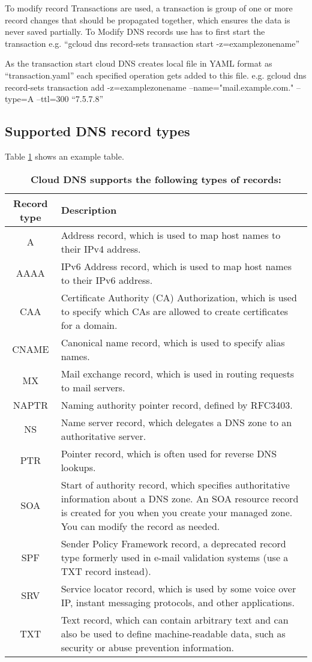 \documentclass[9pt,twocolumn,twoside]{styles/osajnl}
\begin{document}
To modify record Transactions are used, a transaction is group of one or more record changes that should be propagated together, which ensures the data is never saved partially. To Modify DNS records use has to first start the transaction
e.g. “gcloud dns record-sets transaction start -z=examplezonename” \cite{dns-overview}

As the transaction start cloud DNS creates local file in YAML format as “transaction.yaml” each specified operation gets added to this file.
e.g. gcloud dns record-sets transaction add -z=examplezonename --name="mail.example.com." --type=A --ttl=300 “7.5.7.8” \cite{dns-overview}

\subsection{Supported DNS record types}
Table \ref{tab:shape-functions} shows an example table.
\begin{table}[htbp]
\centering
\caption{\bf Cloud DNS supports the following types of records:}
\begin{tabular}{|c|p{7cm}|}
\hline Record type & Description \\
\hline\hline
A & Address record, which is used 
to map host names to their IPv4 address.\\
\hline
AAAA & IPv6 Address record, 
which is used to map host 
names to their IPv6 address.\\
\hline
CAA & Certificate Authority 
(CA) Authorization, which 
is used to specify which CAs 
are allowed to create certificates 
for a domain.\\
\hline
CNAME & Canonical name record, which 
is used to specify alias names.\\
\hline
MX & Mail exchange record, which is 
used in routing requests to mail servers.\\
\hline
NAPTR & Naming authority pointer record, 
defined by RFC3403.\\
\hline
NS & Name server record, which delegates
 a DNS zone to an authoritative server.\\
\hline
PTR & Pointer record, which is often 
used for reverse DNS lookups.\\
\hline
SOA & Start of authority record, which 
specifies authoritative information 
about a DNS zone. An SOA resource 
record is created for you when you create
 your managed zone. You can modify 
the record as needed.\\
\hline
SPF & Sender Policy Framework record, 
a deprecated record type formerly used
 in e-mail validation systems 
(use a TXT record instead).\\
\hline
SRV & Service locator record, which is used 
by some voice over IP, instant 
messaging protocols, and other applications.\\
\hline
TXT & Text record, which can contain 
arbitrary text and can also be used 
to define machine-readable data, such as 
security or abuse prevention information.\\
\hline
\end{tabular}
	\label{tab:shape-functions}
\end{table}
\end{document}
